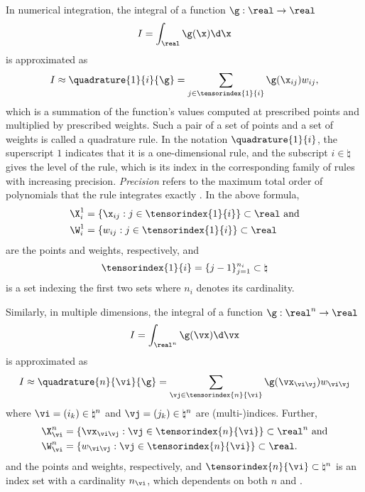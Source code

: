 In numerical integration, the integral of a function $\g: \real \to \real$
\[
  I = \int_\real \g(\x) \d \x
\]
is approximated as
\[
  I \approx \quadrature{1}{i}{\g} = \sum_{j \in \tensorindex{1}{i}} \g(\x_{ij}) w_{ij},
\]
which is a summation of the function's values computed at prescribed points and
multiplied by prescribed weights. Such a pair of a set of points and a set of
weights is called a quadrature rule. In the notation $\quadrature{1}{i}$, the
superscript $1$ indicates that it is a one-dimensional rule, and the subscript
$i \in \natural$ gives the level of the rule, which is its index in the
corresponding family of rules with increasing precision. \emph{Precision} refers
to the maximum total order of polynomials that the rule integrates exactly
\cite{heiss2008}. In the above formula,
\[
  \begin{split}
    & \X^1_i = \{ \x_{ij}: j \in \tensorindex{1}{i} \} \subset \real \text{ and} \\
    & \W^1_i = \{ w_{ij}: j \in \tensorindex{1}{i} \} \subset \real
  \end{split}
\]
are the points and weights, respectively, and
\[
  \tensorindex{1}{i} = \{ j - 1 \}_{j = 1}^{n_i} \subset \natural
\]
is a set indexing the first two sets where $n_i$ denotes its cardinality.

Similarly, in multiple dimensions, the integral of a function $\g: \real^n \to
\real$
\[
  I = \int_{\real^n} \g(\vx) \d \vx
\]
is approximated as
\[
  I \approx \quadrature{n}{\vi}{\g} = \sum_{\vj \in \tensorindex{n}{\vi}} \g(\vx_{\vi \vj}) w_{\vi \vj}
\]
where $\vi = (i_k) \in \natural^n$ and $\vj = (j_k) \in \natural^n$ are
(multi-)indices. Further,
\[
  \begin{split}
    & \X^n_{\vi} = \{ \vx_{\vi \vj}: \vj \in \tensorindex{n}{\vi} \} \subset \real^n \text{ and} \\
    & \W^n_{\vi} = \{ w_{\vi \vj}: \vj \in \tensorindex{n}{\vi} \} \subset \real. \\
  \end{split}
\]
and the points and weights, respectively, and $\tensorindex{n}{\vi} \subset
\natural^n$ is an index set with a cardinality $n_{\vi}$, which dependents on
both $n$ and \vi.

